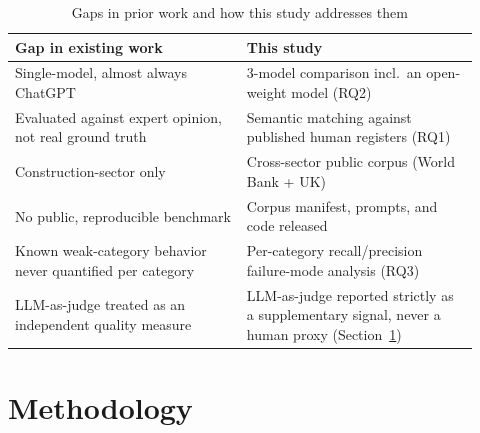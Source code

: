 \documentclass[conference]{IEEEtran}
\begin{document}
\begin{table}[t]
\centering
\caption{Gaps in prior work and how this study addresses them}
\label{tab:gap}
\begin{tabular}{@{}p{0.46\linewidth}p{0.46\linewidth}@{}}
\toprule
\textbf{Gap in existing work} & \textbf{This study} \\
\midrule
Single-model, almost always ChatGPT & 3-model comparison incl.\ an open-weight model (RQ2) \\
Evaluated against expert opinion, not real ground truth & Semantic matching against published human registers (RQ1) \\
Construction-sector only & Cross-sector public corpus (World Bank + UK) \\
No public, reproducible benchmark & Corpus manifest, prompts, and code released \\
Known weak-category behavior never quantified per category & Per-category recall/precision failure-mode analysis (RQ3) \\
LLM-as-judge treated as an independent quality measure & LLM-as-judge reported strictly as a supplementary signal, never a human proxy (Section~\ref{sec:methods}) \\
\bottomrule
\end{tabular}
\end{table}

\section{Methodology}
\label{sec:methods}
\end{document}
